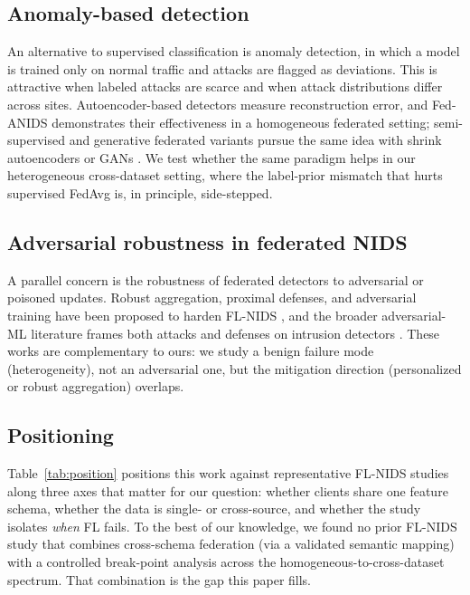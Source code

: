 \documentclass[11pt,a4paper]{article}
\begin{document}
\subsection{Anomaly-based detection}
An alternative to supervised classification is anomaly detection, in which a model
is trained only on normal traffic and attacks are flagged as deviations. This is
attractive when labeled attacks are scarce and when attack distributions differ
across sites. Autoencoder-based detectors measure reconstruction error, and
Fed-ANIDS \cite{fedanids} demonstrates their effectiveness in a homogeneous
federated setting; semi-supervised and generative federated variants pursue the
same idea with shrink autoencoders or GANs \cite{semisup-sae,bjorn-fgan,zeng-fga}.
We test whether the same paradigm helps in our heterogeneous cross-dataset
setting, where the label-prior mismatch that hurts supervised FedAvg is, in
principle, side-stepped.

\subsection{Adversarial robustness in federated NIDS}
A parallel concern is the robustness of federated detectors to adversarial or
poisoned updates. Robust aggregation, proximal defenses, and adversarial training
have been proposed to harden FL-NIDS \cite{ennaji-advrobust,chandu-hada,%
saha-krum,wang-robust}, and the broader adversarial-ML literature frames both
attacks and defenses on intrusion detectors \cite{debicha-advtrain,gadot}. These
works are complementary to ours: we study a benign failure mode (heterogeneity),
not an adversarial one, but the mitigation direction (personalized or robust
aggregation) overlaps.

\subsection{Positioning}

Table~\ref{tab:position} positions this work against representative FL-NIDS
studies along three axes that matter for our question: whether clients share one
feature schema, whether the data is single- or cross-source, and whether the
study isolates \emph{when} FL fails. To the best of our knowledge, we found no
prior FL-NIDS study that combines cross-schema federation (via a validated
semantic mapping) with a controlled break-point analysis across the
homogeneous-to-cross-dataset spectrum.
That combination is the gap this paper fills.
\end{document}
